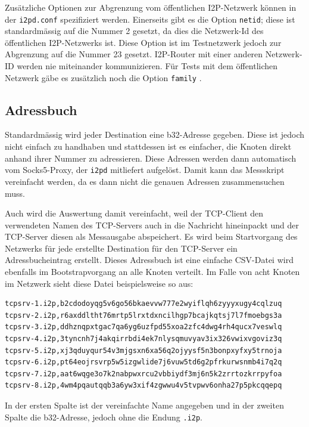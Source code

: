 Zusätzliche Optionen zur Abgrenzung vom öffentlichen I2P-Netzwerk können in der \lstinline|i2pd.conf| spezifiziert werden.
Einerseits gibt es die Option \lstinline|netid|; diese ist standardmässig auf die Nummer 2 gesetzt, da dies die Netzwerk-Id des öffentlichen I2P-Netzwerks ist.
Diese Option ist im Testnetzwerk jedoch zur Abgrenzung auf die Nummer 23 gesetzt. 
I2P-Router mit einer anderen Netzwerk-ID werden nie miteinander kommunizieren.
Für Tests mit dem öffentlichen Netzwerk gäbe es zusätzlich noch die Option \lstinline|family| \parencite{noauthor_family_nodate}.

\subsection{Adressbuch}

Standardmässig wird jeder Destination eine b32-Adresse gegeben.
Diese ist jedoch nicht einfach zu handhaben und stattdessen ist es einfacher, die Knoten direkt anhand ihrer Nummer zu adressieren.
Diese Adressen werden dann automatisch vom Socks5-Proxy, der \lstinline|i2pd| mitliefert aufgelöst.
Damit kann das Messskript vereinfacht werden, da es dann nicht die genauen Adressen zusammensuchen muss.

Auch wird die Auswertung damit vereinfacht, weil der TCP-Client den verwendeten Namen des TCP-Servers auch in die Nachricht hineinpackt und der TCP-Server diesen als Messausgabe abspeichert.
Es wird beim Startvorgang des Netzwerks für jede erstellte Destination für den TCP-Server ein Adressbucheintrag erstellt.
Dieses Adressbuch ist eine einfache CSV-Datei wird ebenfalls im Bootstrapvorgang an alle Knoten verteilt.
Im Falle von acht Knoten im Netzwerk sieht diese Datei beispielsweise so aus:

\begin{lstlisting}[numbers=none]
tcpsrv-1.i2p,b2cdodoyqg5v6go56bkaevvw777e2wyiflqh6zyyyxugy4cqlzuq
tcpsrv-2.i2p,r6axddltht76mrtp5lrxtdxncilhgp7bcajkqtsj7l7fmoebgs3a
tcpsrv-3.i2p,ddhznqpxtgac7qa6yg6uzfpd55xoa2zfc4dwg4rh4qucx7veswlq
tcpsrv-4.i2p,3tyncnh7j4akqirrbdi4ek7nlysqmuvyav3ix326vwixvgoviz3q
tcpsrv-5.i2p,xj3qduyqur54v3mjgsxn6xa56q2ojyysf5n3bonpxyfxy5trnoja
tcpsrv-6.i2p,pt64eojrsvrp5w5izgwlide7j6vuw5td6g2pfrkurwsnmb4i7q2q
tcpsrv-7.i2p,aat6wqge3o7k2nabpwxrcu2vbbiydf3mj6n5k2zrrtozkrrpyfoa
tcpsrv-8.i2p,4wm4pqautqqb3a6yw3xif4zgwwu4v5tvpwv6onha27p5pkcqqepq
\end{lstlisting}

In der ersten Spalte ist der vereinfachte Name angegeben und in der zweiten Spalte die b32-Adresse, jedoch ohne die Endung \lstinline|.i2p|.


